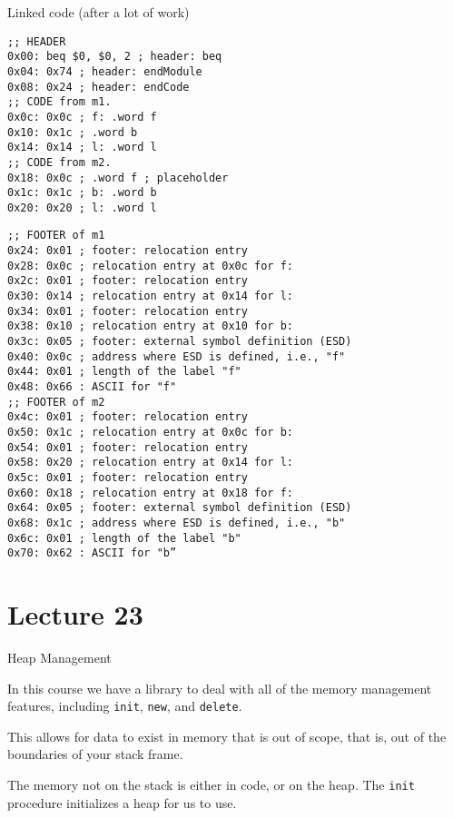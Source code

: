 \documentclass{article}
\begin{document}
Linked code (after a lot of work)

\begin{tcolorbox}
\begin{verbatim}
;; HEADER
0x00: beq $0, $0, 2 ; header: beq
0x04: 0x74 ; header: endModule
0x08: 0x24 ; header: endCode
;; CODE from m1.
0x0c: 0x0c ; f: .word f
0x10: 0x1c ; .word b
0x14: 0x14 ; l: .word l
;; CODE from m2.
0x18: 0x0c ; .word f ; placeholder
0x1c: 0x1c ; b: .word b
0x20: 0x20 ; l: .word l
\end{verbatim}
\end{tcolorbox}

\begin{tcolorbox}
\begin{verbatim}
;; FOOTER of m1
0x24: 0x01 ; footer: relocation entry
0x28: 0x0c ; relocation entry at 0x0c for f:
0x2c: 0x01 ; footer: relocation entry
0x30: 0x14 ; relocation entry at 0x14 for l:
0x34: 0x01 ; footer: relocation entry
0x38: 0x10 ; relocation entry at 0x10 for b:
0x3c: 0x05 ; footer: external symbol definition (ESD)
0x40: 0x0c ; address where ESD is defined, i.e., "f"
0x44: 0x01 ; length of the label "f"
0x48: 0x66 : ASCII for "f"
;; FOOTER of m2
0x4c: 0x01 ; footer: relocation entry
0x50: 0x1c ; relocation entry at 0x0c for b:
0x54: 0x01 ; footer: relocation entry
0x58: 0x20 ; relocation entry at 0x14 for l:
0x5c: 0x01 ; footer: relocation entry
0x60: 0x18 ; relocation entry at 0x18 for f:
0x64: 0x05 ; footer: external symbol definition (ESD)
0x68: 0x1c ; address where ESD is defined, i.e., "b"
0x6c: 0x01 ; length of the label "b"
0x70: 0x62 : ASCII for "b”
\end{verbatim}
\end{tcolorbox}

\section{Lecture 23}\label{lecture-23}

Heap Management

In this course we have a library to deal with all of the memory
management features, including \texttt{init}, \texttt{new}, and
\texttt{delete}.

This allows for data to exist in memory that is out of scope, that is,
out of the boundaries of your stack frame.


The memory not on the stack is either in code, or on the heap. The
\texttt{init} procedure initializes a heap for us to use.
\end{document}
